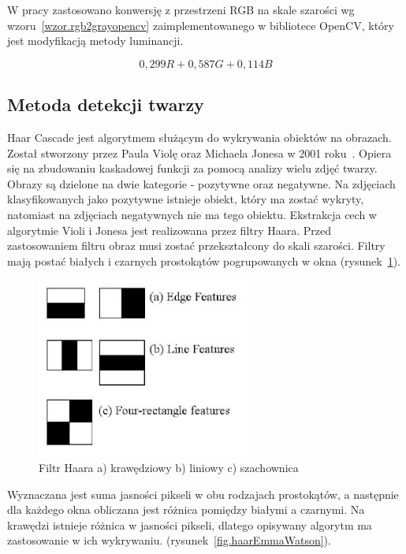 \documentclass[a4paper,twoside,12pt]{book}
\begin{document}
    W pracy zastosowano konwersję z przestrzeni RGB na skale szarości wg wzoru~\ref{wzor.rgb2grayopencv}
    zaimplementowanego w bibliotece OpenCV, który jest modyfikacją metody luminancji.

    \large
    \begin{equation}
        0,299 R + 0,587 G + 0,114 B
        \label{wzor.rgb2grayopencv}
    \end{equation}
    \normalsize

    \subsection{Metoda detekcji twarzy}\label{subsec:algorytm-haar-cascade}

    Haar Cascade jest algorytmem służącym do wykrywania obiektów na obrazach.
    Został stworzony przez Paula Violę oraz Michaela Jonesa w 2001 roku~\cite{violaJones}.
    Opiera się na zbudowaniu kaskadowej funkcji za pomocą analizy wielu zdjęć twarzy.
    Obrazy są dzielone na
    dwie kategorie - pozytywne oraz negatywne.
    Na zdjęciach klasyfikowanych jako pozytywne istnieje obiekt, który ma zostać wykryty, natomiast
    na zdjęciach negatywnych nie ma tego obiektu.
    Ekstrakcja cech w algorytmie Violi i Jonesa jest realizowana przez filtry Haara.
    Przed zastosowaniem filtru obraz musi zostać przekształcony do skali szarości.
    Filtry mają postać białych i czarnych prostokątów pogrupowanych w okna (rysunek~\ref{fig.haarRectangles}).
    \begin{figure}
        \centering
        \includegraphics[width=7cm]{Obrazy/Haar_filter_rectangles.jpg}
        \caption{Filtr Haara a) krawędziowy b) liniowy c) szachownica~\cite{haar}}
        \label{fig.haarRectangles}
    \end{figure}
    Wyznaczana jest suma jasności pikseli w obu rodzajach prostokątów, a
    następnie dla każdego okna obliczana jest różnica pomiędzy białymi a czarnymi.
    Na krawędzi istnieje różnica w jasności pikseli, dlatego opisywany algorytm ma zastosowanie w ich wykrywaniu.
    (rysunek~\ref{fig.haarEmmaWatson}).
\end{document}
